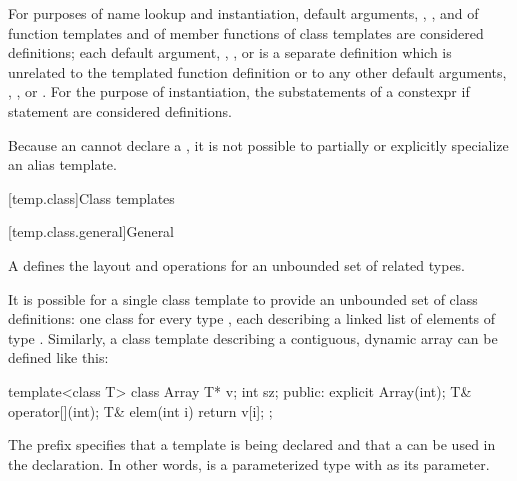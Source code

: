 \pnum
For purposes of name lookup and instantiation,
default arguments,
,
,
and
of function templates
and
of member functions of class templates
are considered definitions;
each
default argument,
,
,
or
is a separate definition
which is unrelated
to the templated function definition or
to any other
default arguments,
,
,
or
.
For the purpose of instantiation, the substatements of a constexpr if
statement are considered definitions.

\pnum
Because an  cannot declare a
, it is not possible to partially or
explicitly specialize an alias template.

[temp.class]{Class templates}

[temp.class.general]{General}

\pnum
A
defines the layout and operations
for an unbounded set of related types.

\pnum
\begin{example}
It is possible for a single class template
to provide an unbounded set of class definitions:
one class  for every type ,
each describing a linked list of elements of type .
Similarly, a class template  describing a contiguous,
dynamic array can be defined like this:
\begin{codeblock}
template<class T> class Array {
  T* v;
  int sz;
public:
  explicit Array(int);
  T& operator[](int);
  T& elem(int i) { return v[i]; }
};
\end{codeblock}
The prefix 
specifies that a template is being declared and that a
 
can be used in the declaration.
In other words,
is a parameterized type with
as its parameter.
\end{example}

